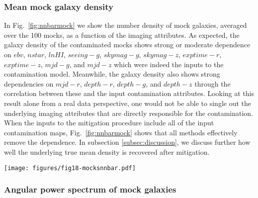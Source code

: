\subsubsection{Mean mock galaxy density}
In Fig.~\ref{fig:nnbarmock} we show the number density of mock galaxies, averaged over the 100 mocks, as a function of the imaging attributes. As expected, the galaxy density of the contaminated mocks shows strong or moderate dependence on $ebv$, $nstar$, $lnHI$, $seeing-g$, $skymag-g$, $skymag-z$, $exptime-r$, $exptime-z$, $mjd-g$, and $mjd-z$ which were indeed the inputs to the contamination model. Meanwhile, the galaxy density also shows strong dependencies on $mjd-r$, $depth-r$, $depth-g$, and $depth-z$ through the correlation between these and the input contamination attributes. Looking at this result alone from a real data perspective, one would not be able to single out the underlying imaging attributes that are directly responsible for the contamination. When the inputs to the mitigation procedure include all of the input contamination maps, Fig.~\ref{fig:nnbarmock} shows that all methods effectively remove the dependence. In subsection \ref{subsec:discussion}, we discuss further how well the underlying true mean density is recovered after mitigation.

\begin{figure*}
    \centering
    \texttt{[image: figures/fig18-mocksnnbar.pdf]}
    \caption{The number density of the mock galaxies as a function of the potential systematics averaged over the 100 mock datasets. The grey shaded region illustrates 1$-\sigma$ dispersion in the null mocks. The dotted curve shows the mean density of the null mocks. The black solid curve shows the mean density dependence on the imaging attributes for the contaminated mocks. The solid red curve shows the mean density after correcting for the systematics with the neural network selection mask. The dashed black curve shows the corrected results with the quadratic polynomial model selection mask. The result of the linear polynomial model is almost unity, and therefore is omitted for clarity.}
    \label{fig:nnbarmock}
\end{figure*}

 
\subsubsection{Angular power spectrum of mock galaxies}

